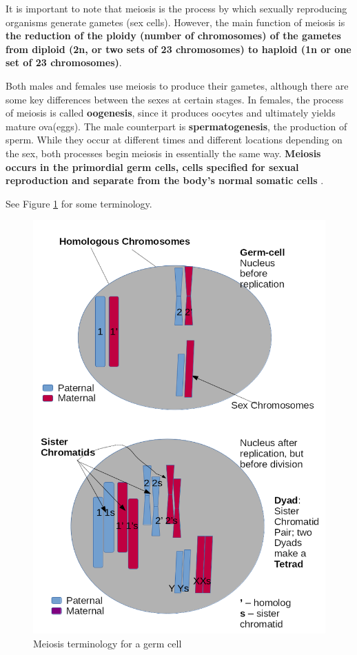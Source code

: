 
It is important to note that \cite{embryo-project} meiosis is the process by which sexually reproducing organisms generate gametes (sex cells). However, the main function of meiosis is \textbf{the reduction of the ploidy (number of chromosomes) of the gametes from diploid (2n, or two sets of 23 chromosomes) to haploid (1n or one set of 23 chromosomes)}.

Both males and females use meiosis to produce their gametes, although there are some key differences between the sexes at certain stages. In females, the process of meiosis is called \textbf{oogenesis}, since it produces oocytes and ultimately yields mature ova(eggs). The male counterpart is \textbf{spermatogenesis}, the production of sperm. While they occur at different times and different locations depending on the sex, both processes begin meiosis in essentially the same way. \textbf{Meiosis occurs in the primordial germ cells, cells specified for sexual reproduction and separate from the body’s normal somatic cells}  \cite{embryo-project}.

See Figure \ref{fig: meiosis-1} for some terminology.

\begin{figure}[h!]
    \centering
    \includegraphics[scale=0.3]{meiosis-1.png}
    \caption{Meiosis terminology for a germ cell}
    \label{fig: meiosis-1}
\end{figure}

